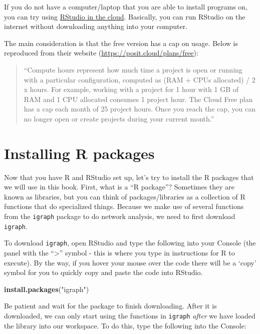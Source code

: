\documentclass[
]{book}
\newenvironment{Shaded}{\begin{snugshade}}{\end{snugshade}}
\newcommand{\FunctionTok}[1]{\textcolor[rgb]{0.13,0.29,0.53}{\textbf{#1}}}
\newcommand{\NormalTok}[1]{#1}
\newcommand{\StringTok}[1]{\textcolor[rgb]{0.31,0.60,0.02}{#1}}
\begin{document}
If you do not have a computer/laptop that you are able to install programs on, you can try using \href{https://posit.cloud/}{RStudio in the cloud}. Basically, you can run RStudio on the internet without downloading anything into your computer.

The main consideration is that the free version has a cap on usage. Below is reproduced from their website (\url{https://posit.cloud/plans/free}):

\begin{quote}
``Compute hours represent how much time a project is open or running with a particular configuration, computed as (RAM + CPUs allocated) / 2 x hours. For example, working with a project for 1 hour with 1 GB of RAM and 1 CPU allocated consumes 1 project hour. The Cloud Free plan has a cap each month of 25 project hours. Once you reach the cap, you can no longer open or create projects during your current month.''
\end{quote}

\section{Installing R packages}\label{installing-r-packages}

Now that you have R and RStudio set up, let's try to install the R packages that we will use in this book. First, what is a ``R package''? Sometimes they are known as libraries, but you can think of packages/libraries as a collection of R functions that do specialized things. Because we make use of several functions from the \texttt{igraph} package to do network analysis, we need to first download \texttt{igraph}.

To download \texttt{igraph}, open RStudio and type the following into your Console (the panel with the ``\textgreater{}'' symbol - this is where you type in instructions for R to execute). By the way, if you hover your mouse over the code there will be a `copy' symbol for you to quickly copy and paste the code into RStudio.

\begin{Shaded}
\begin{Highlighting}[]
\FunctionTok{install.packages}\NormalTok{(}\StringTok{"igraph"}\NormalTok{)}
\end{Highlighting}
\end{Shaded}

Be patient and wait for the package to finish downloading. After it is downloaded, we can only start using the functions in \texttt{igraph} \emph{after} we have loaded the library into our workspace. To do this, type the following into the Console:
\end{document}
